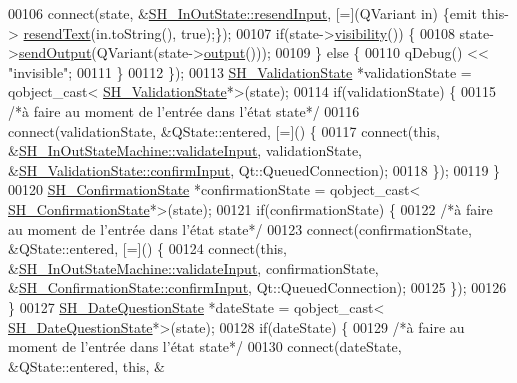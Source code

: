 \begin{DoxyCode}
00106         connect(state, &\hyperlink{classSH__InOutState_a1f00480afefd173002cf56d4c4128048}{SH\_InOutState::resendInput}, [=](QVariant in) \{emit this->
      \hyperlink{classSH__InOutStateMachine_a526822c66b46aa0cd81ba4473fa5573f}{resendText}(in.toString(), \textcolor{keyword}{true});\});
00107         \textcolor{keywordflow}{if}(state->\hyperlink{classSH__InOutState_a3a18752c4122c26a2ebf38310c9c1b75}{visibility}()) \{
00108             state->\hyperlink{classSH__InOutState_a77921c5f42059bc97361f4ff7827da12}{sendOutput}(QVariant(state->\hyperlink{classSH__InOutState_a17ed7eaf5e3ed5af80a4f9fe65d5bfd9}{output}()));
00109         \} \textcolor{keywordflow}{else} \{
00110             qDebug() << \textcolor{stringliteral}{"invisible"};
00111         \}
00112     \});
00113     \hyperlink{classSH__ValidationState}{SH\_ValidationState} *validationState = qobject\_cast<
      \hyperlink{classSH__ValidationState}{SH\_ValidationState}*>(state);
00114     \textcolor{keywordflow}{if}(validationState) \{
00115         \textcolor{comment}{/*à faire au moment de l'entrée dans l'état state*/}
00116         connect(validationState, &QState::entered, [=]() \{
00117             connect(\textcolor{keyword}{this}, &\hyperlink{classSH__InOutStateMachine_aec1b3fef3c1f82499aa1f73beaecd08a}{SH\_InOutStateMachine::validateInput}, 
      validationState, &\hyperlink{classSH__ConfirmationState_a039267260de5d102ac7511e6a5fae87f}{SH\_ValidationState::confirmInput}, Qt::QueuedConnection);
00118         \});
00119     \}
00120     \hyperlink{classSH__ConfirmationState}{SH\_ConfirmationState} *confirmationState = qobject\_cast<
      \hyperlink{classSH__ConfirmationState}{SH\_ConfirmationState}*>(state);
00121     \textcolor{keywordflow}{if}(confirmationState) \{
00122         \textcolor{comment}{/*à faire au moment de l'entrée dans l'état state*/}
00123         connect(confirmationState, &QState::entered, [=]() \{
00124             connect(\textcolor{keyword}{this}, &\hyperlink{classSH__InOutStateMachine_aec1b3fef3c1f82499aa1f73beaecd08a}{SH\_InOutStateMachine::validateInput}, 
      confirmationState, &\hyperlink{classSH__ConfirmationState_a039267260de5d102ac7511e6a5fae87f}{SH\_ConfirmationState::confirmInput}, Qt::QueuedConnection);
00125         \});
00126     \}
00127     \hyperlink{classSH__DateQuestionState}{SH\_DateQuestionState} *dateState = qobject\_cast<
      \hyperlink{classSH__DateQuestionState}{SH\_DateQuestionState}*>(state);
00128     \textcolor{keywordflow}{if}(dateState) \{
00129         \textcolor{comment}{/*à faire au moment de l'entrée dans l'état state*/}
00130         connect(dateState, &QState::entered, \textcolor{keyword}{this}, &

\end{DoxyCode}
